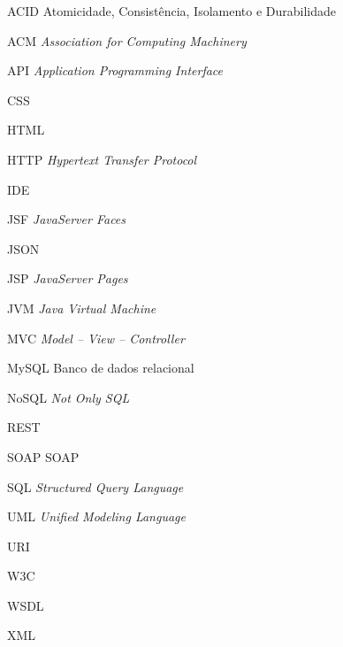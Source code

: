 
\begin{SingleSpace}

\begin{siglas}
\item[ACID]  Atomicidade, Consistência, Isolamento e Durabilidade
\item[ACM]   \textit{Association for Computing Machinery}
\item[API]   \textit{Application Programming Interface}
\item[CSS]	 \textit{}
\item[HTML]	 \textit{}
\item[HTTP]  \textit{Hypertext Transfer Protocol}
\item[IDE]	 \textit{}
\item[JSF]   \textit{JavaServer Faces}
\item[JSON]	 \textit{}
\item[JSP]   \textit{JavaServer Pages}
\item[JVM]   \textit{Java Virtual Machine}
\item[MVC]   \textit{Model -- View -- Controller}
\item[MySQL] Banco de dados relacional
\item[NoSQL] \textit{Not Only SQL}
\item[REST]  \textit{}
\item[SOAP]	 SOAP
\item[SQL]   \textit{Structured Query Language}
\item[UML]   \textit{Unified Modeling Language}
\item[URI]   \textit{}
\item[W3C]   \textit{}
\item[WSDL]   \textit{}
\item[XML]   \textit{}

\end{siglas}

\end{SingleSpace}
